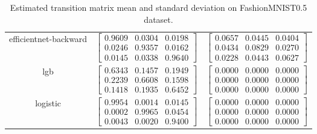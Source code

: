\documentclass{article} %
\begin{document}
\begin{table}
\begin{tabular}{ccc}
efficientnet-backward & $\begin{bmatrix}0.9609 & 0.0304 & 0.0198\\0.0246 & 0.9357 & 0.0162\\0.0145 & 0.0338 & 0.9640\end{bmatrix}$ & $\begin{bmatrix}0.0657 & 0.0445 & 0.0404\\0.0434 & 0.0829 & 0.0270\\0.0228 & 0.0443 & 0.0627\end{bmatrix}$\\
lgb & $\begin{bmatrix}0.6343 & 0.1457 & 0.1949\\0.2239 & 0.6608 & 0.1598\\0.1418 & 0.1935 & 0.6452\end{bmatrix}$ & $\begin{bmatrix}0.0000 & 0.0000 & 0.0000\\0.0000 & 0.0000 & 0.0000\\0.0000 & 0.0000 & 0.0000\end{bmatrix}$\\
logistic & $\begin{bmatrix}0.9954 & 0.0014 & 0.0145\\0.0002 & 0.9965 & 0.0454\\0.0043 & 0.0020 & 0.9400\end{bmatrix}$ & $\begin{bmatrix}0.0000 & 0.0000 & 0.0000\\0.0000 & 0.0000 & 0.0000\\0.0000 & 0.0000 & 0.0000\end{bmatrix}$\\
\end{tabular}\caption{
  Estimated transition matrix mean and standard deviation on FashionMNIST0.5 dataset.
  \label{tab:T-FashionMNIST0.5}
}\end{table}
\end{document}
